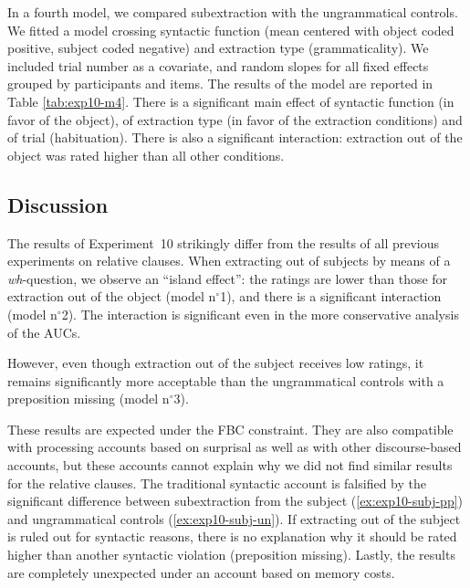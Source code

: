 

In a fourth model, we compared subextraction with the ungrammatical controls. We fitted a model crossing syntactic function (mean centered with object coded positive, subject coded negative) and extraction type (grammaticality). We included trial number as a covariate, and random slopes for all fixed effects grouped by participants and items. The results of the model are reported in Table \ref{tab:exp10-m4}. 
There is a significant main effect of syntactic function (in favor of the object), of extraction type (in favor of the extraction conditions) and of trial (habituation). There is also a significant interaction: extraction out of the object was rated higher than all other conditions.



\subsection{Discussion}

The results of Experiment~10 strikingly differ from the results of all previous experiments on relative clauses. When extracting out of subjects by means of a \emph{wh}-question, we observe an ``island effect'': the ratings are lower than those for extraction out of the object (model n$^{\circ}$1), and there is a significant interaction (model n$^{\circ}$2). The interaction is significant even in the more conservative analysis of the AUCs.

However, even though extraction out of the subject receives low ratings, it remains significantly more acceptable than the ungrammatical controls with a preposition missing (model n$^{\circ}$3). 

These results are expected under the FBC constraint. They are also compatible with processing accounts based on surprisal as well as with other discourse-based accounts, but these accounts cannot explain why we did not find similar results for the relative clauses. The traditional syntactic account is falsified by the significant difference between subextraction from the subject (\ref{ex:exp10-subj-pp}) and ungrammatical controls (\ref{ex:exp10-subj-un}). If extracting out of the subject is ruled out for syntactic reasons, there is no explanation why it should be rated higher than another syntactic violation (preposition missing). Lastly, the results are completely unexpected under an account based on memory costs.
